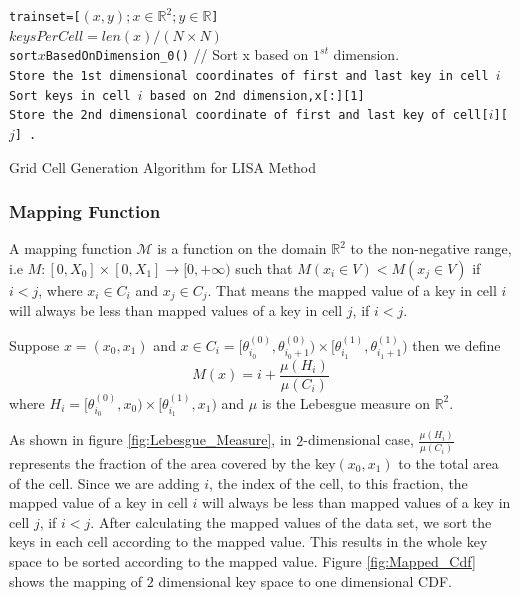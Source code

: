 \begin{algorithm}[H]
    \SetAlgoLined
     \texttt{trainset=[$(x,y);x \in \mathbb{R}^{2};y \in \mathbb{R}$]} \\
     \texttt{$keysPerCell =  len(x) \slash (N \times N) $}\\
     \texttt{sort$x$BasedOnDimension\_0()} // Sort x based on $1^{st}$ dimension. \\
     {
        \texttt{Store the 1st dimensional coordinates of first and last key in cell $i$} \\
        \texttt{Sort keys in cell $i$ based on 2nd dimension,x[:][1] }\\
     }
      {
         {
            \texttt{Store the 2nd dimensional coordinate of first and last key of cell[$i$][$j$] .} \\
		 }
      }
     \caption{Grid Cell Generation Algorithm for LISA Method}
     \label{Training_LISA_Baseline}
\end{algorithm}

\subsubsection{Mapping Function}
\label{sssec:Mapping_Function}
A mapping function $\mathcal{M}$ is a function on the domain $\mathbb{R}^{2}$ to the non-negative range, i.e $M:[0,X_{0}]\times[0,X_{1}]\to [0,+\infty)$ such that
    $ M(x_{i} \in V) <  M(x_{j} \in V)$ if $i<j$, where $x_{i} \in C_{i}$ and $x_{j} \in C_{j}$. That means the mapped value of a key in cell $i$ will always be less than mapped values of a key in cell $j$, if $i <j$. 
    
Suppose $x = (x_{0}, x_{1})$ and $x \in C_{i} = [\theta^{(0)}_{i_0},\theta^{(0)}_{i_0+1}) \times [\theta^{(1)}_{i_1},\theta^{(1)}_{i_1+1}) $ then we define 
$$M(x) = i+ \frac {\mu(H_{i})}{\mu(C_{i})} $$ where $H_{i} = [\theta^{(0)}_{i_0},x_{0}) \times [\theta^{(1)}_{i_1},x_{1}) $ and $\mu$ is the Lebesgue measure on $\mathbb{R}^2$.

As shown in figure \ref{fig:Lebesgue_Measure}, in $2$-dimensional case, $\frac {\mu(H_{i})}{\mu(C_{i})}$ represents the fraction of the area covered by the key$(x_{0}, x_{1})$ to the total area of the cell. Since we are adding $i$, the index of the cell, to this fraction, the mapped value of a key in cell $i$ will always be less than mapped values of a key in cell $j$, if $i<j$. After calculating the mapped values of the data set, we sort the keys in each cell according to the mapped value. This results in the whole key space to be sorted according to the mapped value. Figure \ref{fig:Mapped_Cdf} shows the mapping of $2$ dimensional key space to one dimensional CDF.

